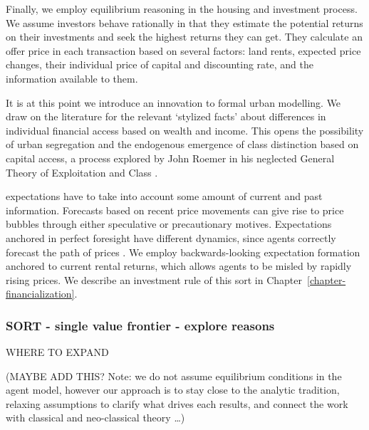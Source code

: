 {Finally, we employ \gls{equilibrium reasoning} in the housing and investment process. We assume investors behave rationally in that they estimate the potential returns on their investments and seek the highest returns they can get. They calculate an offer price in each transaction based on several factors: land rents, expected price changes, their individual price of capital and discounting rate, and the information available to them.

It is at this point we introduce an innovation to formal urban modelling. We draw on the literature for the relevant `\gls{stylized facts}' about differences in individual financial access based on wealth and income. This opens the possibility of urban segregation and the endogenous emergence of \gls{class} distinction based on capital access, a process explored by John Roemer in his neglected General Theory of Exploitation and Class \cite{roemerGeneralTheoryExploitation1982}.  

\Glspl{expectation} have to take into account some amount of current and past information. Forecasts based on recent price movements can give rise to \gls{price bubble}s through either speculative or precautionary motives. Expectations anchored in \gls{perfect foresight} have different dynamics, since agents correctly forecast the path of prices \cite{muthRationalExpectationsTheory1961}. We employ backwards-looking expectation formation anchored 
to current rental returns, which allows agents to be misled by rapidly rising prices. We describe an investment rule of this sort in Chapter~\ref{chapter-financialization}. 

\subsubsection{SORT - single value frontier - explore reasons}
WHERE TO EXPAND%

(MAYBE ADD THIS? Note: we do not assume equilibrium conditions in the agent model, however our approach is to stay close to the analytic tradition, relaxing assumptions to clarify what drives each results, and connect the work with classical and neo-classical theory \dots)

}
